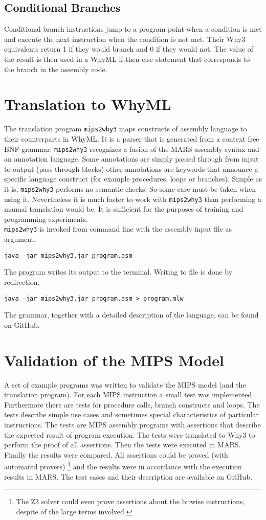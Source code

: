 \subsection{Conditional Branches}

Conditional branch instructions jump to a program point when a condition is met and execute the next instruction
when the condition is not met. Their Why3 equivalents return 1 if they would branch and 0 if they would not. The
value of the result is then used in a WhyML if-then-else statement that corresponds to the branch in the assembly code.

\section{Translation to WhyML}

The translation program \verb"mips2why3" maps constructs of assembly language to their counterparts in WhyML. It is 
a parser that is generated from a context free BNF grammar. \verb"mips2why3" recognizes a fusion of the MARS assembly 
syntax and an annotation language. Some annotations are simply passed through from input to output (pass through
blocks) other annotations are keywords that announce a specific language construct (for example procedures, loops
or branches). Simple as it is, \verb"mips2why3" performs no semantic checks. So some care must be taken when using it.
Nevertheless it is much faster to work with \verb"mips2why3" than performing a manual translation would be. It is 
sufficient for the purposes of training and programming experiments. \\
\verb"mips2why3" is invoked from command line with the assembly input file as argument.
\begin{lstlisting}
java -jar mips2why3.jar program.asm
\end{lstlisting} 
The program writes its output to the terminal. Writing to file is done by redirection.
\begin{lstlisting}
java -jar mips2why3.jar program.asm > program.mlw
\end{lstlisting} 
The grammar, together with a detailed description of the language, can be found on GitHub.

\section{Validation of the MIPS Model}
A set of example programs was written to validate the MIPS model (and the translation program).
For each MIPS instruction a small test was implemented. Furthermore there are tests for procedure calls,
branch constructs and loops. The tests describe simple use cases and sometimes special characteristics of 
particular instructions. The tests are MIPS assembly programs with assertions that describe the expected result
of program execution. The tests were translated to Why3 to perform the proof of all assertions. Then the tests
were executed in MARS. Finally the results were compared. All assertions could be proved (with automated provers)
\footnote{The Z3 solver could even prove assertions about the bitwise instructions, despite of the large terms involved.}
 and the results were in accordance with the execution results in MARS. 
The test cases and their description are available on GitHub.  
